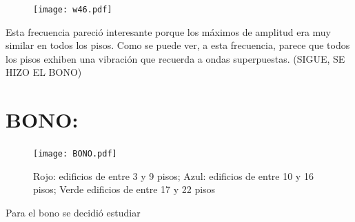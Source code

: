 \documentclass[11pt,letterpaper]{exam}
\begin{document}
\begin{figure}[H]
\centering
\texttt{[image: w46.pdf]}
\end{figure}
Esta frecuencia pareció interesante porque los máximos de amplitud era muy similar en todos los pisos. Como se puede ver, a esta frecuencia, parece que todos los pisos exhiben una vibración que recuerda a ondas superpuestas. (SIGUE, SE HIZO EL BONO)

\section{BONO:}
\begin{figure}[H]
\centering
\texttt{[image: BONO.pdf]}
\caption{Rojo: edificios de entre 3 y 9 pisos; Azul: edificios de entre 10 y 16 pisos; Verde edificios de entre 17 y 22 pisos}
\end{figure}
Para el bono se decidió estudiar
\end{document}
